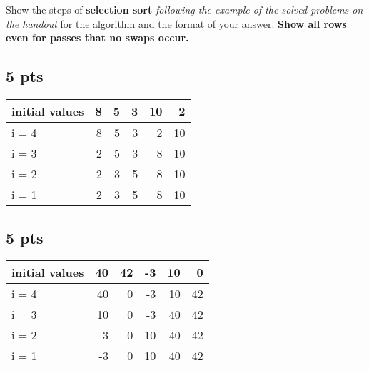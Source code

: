 \documentclass[11pt]{article}
\begin{document}
\section{}
\label{sec:org9953340}
Show the steps of \textbf{selection sort} \emph{following the example of the solved
problems on the handout} for the algorithm and the format of your answer.
\textbf{Show all rows even for passes that no swaps occur.}

\subsection{5 pts}
\label{sec:org715eabd}

\begin{center}
\begin{tabular}{lrrrrr}
initial values & 8 & 5 & 3 & 10 & 2\\
\hline
i = 4 & 8 & 5 & 3 & 2 & 10\\
\hline
i = 3 & 2 & 5 & 3 & 8 & 10\\
\hline
i = 2 & 2 & 3 & 5 & 8 & 10\\
\hline
i = 1 & 2 & 3 & 5 & 8 & 10\\
\end{tabular}
\end{center}

\subsection{5 pts}
\label{sec:org64dd6f6}

\begin{center}
\begin{tabular}{lrrrrr}
initial values & 40 & 42 & -3 & 10 & 0\\
\hline
i = 4 & 40 & 0 & -3 & 10 & 42\\
\hline
i = 3 & 10 & 0 & -3 & 40 & 42\\
\hline
i = 2 & -3 & 0 & 10 & 40 & 42\\
\hline
i = 1 & -3 & 0 & 10 & 40 & 42\\
\end{tabular}
\end{center}
\end{document}
